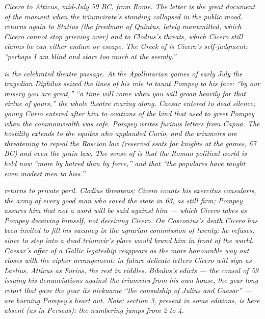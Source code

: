 
\textit{Cicero to Atticus, mid-July 59 BC, from Rome. The
letter is the great document of the moment when the
triumvirate's standing collapsed in the public mood.  returns again to Statius (the freedman of Quintus, lately
manumitted, which Cicero cannot stop grieving over) and to
Clodius's threats, which Cicero still claims he can either
endure or escape. The Greek of  is Cicero's
self-judgment: ``perhaps I am blind and stare too much at the
seemly.''}

\textit{ is the celebrated theatre passage. At
the Apollinarian games of early July the tragedian Diphilus
seized the lines of his role to taunt Pompey to his face:
``by our misery you are great,'' ``a time will come when you
will groan heavily for that virtue of yours,'' the whole
theatre roaring along. Caesar entered to dead silence; young
Curio entered after him to ovations of the kind that used to
greet Pompey when the commonwealth was safe. Pompey writes
furious letters from Capua. The hostility extends to the
\textit{equites} who applauded Curio, and the triumvirs are
threatening to repeal the Roscian law (reserved seats for
knights at the games, 67 BC) and even the grain law. The
sense of  is that the Roman political world is
held now ``more by hatred than by force,'' and that ``the
populares have taught even modest men to hiss.''}

\textit{ returns to private peril. Clodius
threatens; Cicero counts his \textit{exercitus consularis}, the
army of every good man who saved the state in 63, as still
firm; Pompey assures him that not a word will be said against
him --- which Cicero takes as Pompey deceiving himself, not
deceiving Cicero. On Cosconius's death Cicero has been
invited to fill his vacancy in the agrarian commission of
twenty; he refuses, since to step into a dead triumvir's
place would brand him in front of the world. Caesar's offer
of a Gallic legateship reappears as the more honourable way
out.  closes with the cipher arrangement: in
future delicate letters Cicero will sign as Laelius, Atticus
as Furius, the rest \textit{in riddles}. Bibulus's edicts ---
the consul of 59 issuing his denunciations against the
triumvirs from his own house, the year-long retort that gave
the year its nickname ``the consulship of Julius and Caesar''
--- are burning Pompey's heart out. Note: section 3, present
in some editions, is here absent (as in Perseus); the
numbering jumps from 2 to 4.}
